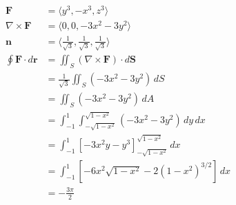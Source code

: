 \documentclass{article}
\begin{document}
\begin{align*}
  \mathbf{F}                          & = \langle y^3, -x^3, z^3 \rangle                                                    \\
  \nabla \times \mathbf{F}            & = \langle 0, 0, - 3 x^2 - 3 y^2 \rangle                                             \\
  \mathbf{n}                          & = \langle \frac{1}{\sqrt{3}}, \frac{1}{\sqrt{3}}, \frac{1}{\sqrt{3}} \rangle        \\
  \oint \mathbf{F} \cdot d \mathbf{r} & = \iint_S (\nabla \times \mathbf{F}) \cdot d \mathbf{S}                             \\
                                      & = \frac{1}{\sqrt{3}} \iint_S (-3 x^2 - 3 y^2) \,dS                                  \\
                                      & = \iint_S (-3 x^2 - 3 y^2) \,dA                                                     \\
                                      & = \int_{-1}^1 \int_{-\sqrt{1 - x^2}}^{\sqrt{1 - x^2}} (-3 x^2 - 3 y^2) \,dy \,dx    \\
                                      & = \int_{-1}^1 \left[ -3 x^2 y - y^3 \right]_{-\sqrt{1 - x^2}}^{\sqrt{1 - x^2}} \,dx \\
                                      & = \int_{-1}^1 [-6 x^2 \sqrt{1 - x^2} - 2 (1 - x^2)^{3 / 2}] \,dx                    \\
                                      & = -\frac{3 \pi}{2}
\end{align*}

\setcounter{subsubsection}{10}
\subsubsection{}
\end{document}
